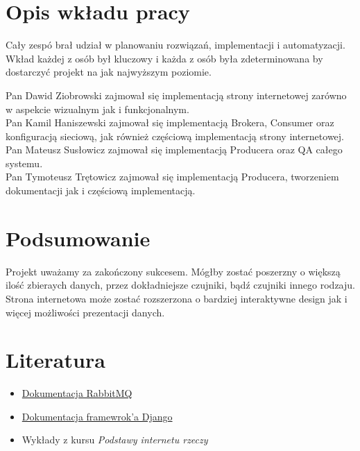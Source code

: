 \documentclass[12pt,a4paper]{article}
\begin{document}
    \section{Opis wkładu pracy}
    Cały zespó brał udział w planowaniu rozwiązań, implementacji i automatyzacji. Wkład każdej z osób był kluczowy i każda z osób była zdeterminowana by dostarczyć projekt na jak najwyższym poziomie.

    \vspace*{3mm}

    \noindent
    Pan Dawid Ziobrowski zajmował się implementacją strony internetowej zarówno w aspekcie wizualnym jak i funkcjonalnym.
    \\Pan Kamil Haniszewski zajmował się implementacją Brokera, Consumer oraz konfiguracją sieciową, jak również częściową implementacją strony internetowej.
    \\Pan Mateusz Susłowicz zajmował się implementacją Producera oraz QA całego systemu.
    \\Pan Tymoteusz Trętowicz zajmował się implementacją Producera, tworzeniem dokumentacji jak i częściową implementacją.

    \pagebreak
    \section{Podsumowanie}
    Projekt uważamy za zakończony sukcesem. Mógłby zostać poszerzny o większą ilość zbieraych danych, przez dokładniejsze czujniki, bądź czujniki innego rodzaju. Strona internetowa może zostać rozszerzona o bardziej interaktywne design jak i więcej możliwości prezentacji danych.

    \section{Literatura}
    \begin{itemize}
        \item \href{https://www.rabbitmq.com/documentation.html}{Dokumentacja RabbitMQ}
        \item \href{https://docs.djangoproject.com/en/4.1/}{Dokumentacja framewrok'a Django}
        \item Wykłady z kursu \emph{Podstawy internetu rzeczy}
    \end{itemize}
\end{document}
